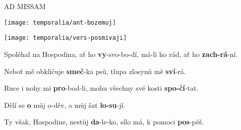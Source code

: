 \documentclass[a4paper, twoside, 12pt]{article}
\begin{document}

 


\trIngrediente

\vspace{4mm}

\begin{center}
{\large AD MISSAM}
\end{center}


\vfill
\pagebreak


\noindent \texttt{[image: temporalia/ant-bozemuj]}

\noindent \texttt{[image: temporalia/vers-posmivaji]}

 Spoléhal na Hospodina, ať ho \textbf{vy}-svo-bo-dí, \hspace{2.5mm} má-li ho rád, ať ho \hspace{7.5mm} \textbf{zach-rá}-ní.~\Rbardot{}

 Neboť mě obkličuje \hspace{14mm} \textbf{smeč}-ka psů, \hspace{3mm} tlupa zlosynů mě \hspace{10.5mm} \textbf{sví}-rá.

 Ruce i nohy mi \hspace{21mm} \textbf{pro}-bod-li, \hspace{5mm} mohu všechny své kosti \hspace{1mm} \textbf{spo-čí}-tat.~\Rbardot{}

 Dělí se \hspace{34mm} \textbf{o} můj o-děv, \hspace{3mm} o můj šat \hspace{22mm} \textbf{lo-su}-jí.

 Ty však, Hospodine, nestůj \hspace{4mm} \textbf{da}-le-ko, \hspace{8mm} sílo má, k pomoci \hspace{10mm} \textbf{pos}-pěš.~\Rbardot{}
\end{document}
